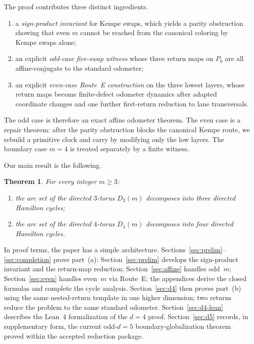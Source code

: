 \documentclass[11pt]{article}
\newtheorem{theorem}{Theorem}
\begin{document}
The proof contributes three distinct ingredients.
\begin{enumerate}[label=\textup{(\roman*)},leftmargin=2.5em]
\item a \emph{sign-product invariant} for Kempe swaps, which yields a parity obstruction showing that even $m$ cannot be reached from the canonical coloring by Kempe swaps alone;
\item an explicit \emph{odd-case five-swap witness} whose three return maps on $P_0$ are all affine-conjugate to the standard odometer;
\item an explicit \emph{even-case Route~E construction} on the three lowest layers, whose return maps become finite-defect odometer dynamics after adapted coordinate changes and one further first-return reduction to lane transversals.
\end{enumerate}

The odd case is therefore an exact affine odometer theorem.
The even case is a repair theorem: after the parity obstruction blocks the canonical Kempe route, we rebuild a primitive clock and carry by modifying only the low layers.
The boundary case $m=4$ is treated separately by a finite witness.

Our main result is the following.


\begin{theorem}\label{thm:main-all}
For every integer $m\ge 3$:
\begin{enumerate}[label=\textup{(\alph*)}]
\item the arc set of the directed $3$-torus $D_3(m)$ decomposes into three directed Hamilton cycles;
\item the arc set of the directed $4$-torus $D_4(m)$ decomposes into four directed Hamilton cycles.
\end{enumerate}
\end{theorem}

In proof terms, the paper has a simple architecture.
Sections~\ref{sec:prelim}--\ref{sec:completion} prove part~(a): Section~\ref{sec:prelim} develops the sign-product invariant and the return-map reduction; Section~\ref{sec:affine} handles odd~$m$; Section~\ref{sec:even} handles even~$m$ via Route~E; the appendices derive the closed formulas and complete the cycle analysis.
Section~\ref{sec:d4} then proves part~(b) using the same nested-return template in one higher dimension; two returns reduce the problem to the same standard odometer.
Section~\ref{sec:d4-lean} describes the Lean~4 formalization of the $d=4$ proof.
Section~\ref{sec:d5} records, in supplementary form, the current odd-$d=5$ boundary-globalization theorem proved within the accepted reduction package.
\end{document}
